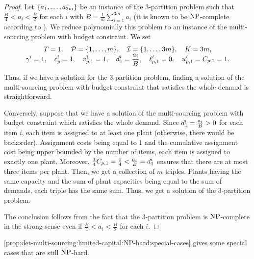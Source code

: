 \begin{proof}
Let $\crbracket{a_1,\ldots,a_{3m}}$ be an instance of the 3-partition problem such that $\frac{B}{4} < a_i < \frac{B}{2}$ for each $i$ with $B=\frac{1}{m}\sum_{i=1}^{3m}a_i$ (it is known to be $\operatorname{NP}$-complete according to \citet{Garey1979}).
We reduce polynomially this problem to an instance of the multi-sourcing problem with budget constraint.
We set
\begin{equation}
\begin{array}{c}
  \ds
  \horizon=1
  ,\quad
  \plants=\range[1]{m}
  ,\quad
  \REF=\range[1]{3m}
  ,\quad
  \capital = 3m,
  \\ \smallskip
  \ds
  \backorder^i=1
  ,\quad
  \affect_p^i=1
  ,\quad
  \rate_{p,1}^i=1
  ,\quad
  \demand_1^i=\frac{a_i}{B}
  ,\quad
  \lb_{p,1}^i=0
  ,\quad
  \ub_{p,1}^i=\capacity_{p,1}=1.
\end{array}
\end{equation}
Thus, if we have a solution for the 3-partition problem, finding a solution of the multi-sourcing problem with budget constraint that satisfies the whole demand is straightforward.


Conversely, suppose that we have a solution of the multi-sourcing problem with budget constraint which satisfies the whole demand.
Since $d_1^i=\frac{a_i}{B}>0$ for each item $i$, each item is assigned to at least one plant (otherwise, there would be backorder).
Assignment costs being equal to 1 and the cumulative assignment cost being upper bounded by the number of items, each item is assigned to exactly one plant.
Moreover, $\frac{1}{4}C_{p,1}=\frac{1}{4} < \frac{a_i}{B}=d_1^i$ ensures that there are at most three items per plant.
Then, we get a collection of $m$ triples.
Plants having the same capacity and the sum of plant capacities being equal to the sum of demands, each triple has the same sum.
Thus, we get a solution of the 3-partition problem.


The conclusion follows from the fact that the 3-partition problem is $\operatorname{NP}$-complete in the strong sense even if $\frac{B}{4} < a_i < \frac{B}{2}$ for each $i$.
\end{proof}


\cref{prop:det-multi-sourcing:limited-capital:NP-hard:special-cases} gives some special cases that are still $\operatorname{NP}$-hard.


